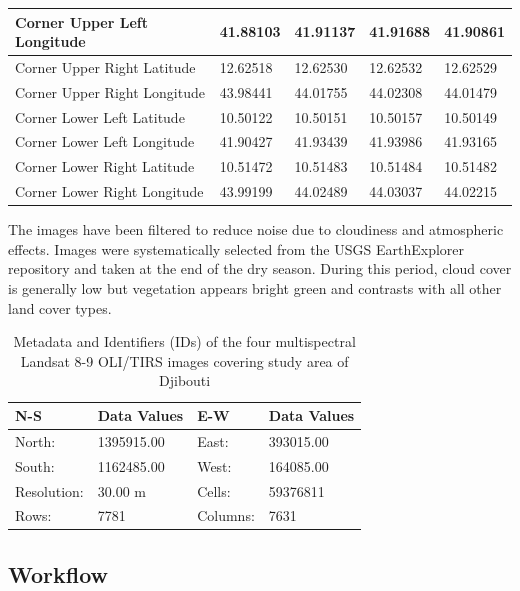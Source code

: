 \documentclass[jimaging,article,submit,pdftex,moreauthors]{Definitions/mdpi}
\begin{document}
\begin{table}[!ht]
\begin{tabular}{ l | l | l | l | l }
        Corner Upper Left Longitude & 41.88103 & 41.91137 & 41.91688 & 41.90861 \\ \hline
        Corner Upper Right Latitude & 12.62518 & 12.62530 & 12.62532 & 12.62529 \\ \hline
        Corner Upper Right Longitude & 43.98441 & 44.01755 & 44.02308 & 44.01479 \\ \hline
        Corner Lower Left Latitude & 10.50122 & 10.50151 & 10.50157 & 10.50149 \\ \hline
        Corner Lower Left Longitude & 41.90427 & 41.93439 & 41.93986 & 41.93165 \\ \hline
        Corner Lower Right Latitude & 10.51472 & 10.51483 & 10.51484 & 10.51482 \\ \hline
        Corner Lower Right Longitude & 43.99199 & 44.02489 & 44.03037 & 44.02215 \\ \hline
    \end{tabular}
\end{table}

 The images have been filtered to reduce noise due to cloudiness and atmospheric effects. Images were systematically selected from the USGS EarthExplorer repository and taken at the end of the dry season. During this period, cloud cover is generally low but vegetation appears bright green and contrasts with all other land cover types. 

\begin{table}[H]
\caption{Metadata and Identifiers (IDs) of the four multispectral Landsat 8-9 OLI/TIRS images covering study area of Djibouti}\label{tab03}
\setlength\tabcolsep{0pt}
\begin{tabularx}{\textwidth}{ X X X X}
\textbf{N-S} & \textbf{Data Values} & \textbf{E-W} & \textbf{Data Values}\\
\midrule
	North: & 1395915.00 &  East: & 393015.00 \\
	South: &  1162485.00 &  West: & 164085.00 \\
	Resolution: &  30.00 m & Cells: & 59376811 \\
	Rows: & 7781 & Columns: & 7631 \\
\bottomrule
\end{tabularx}
\end{table}

\subsection{Workflow}
\end{document}
